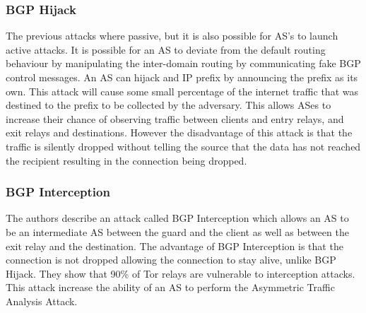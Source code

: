 \documentclass[9pt,technote]{IEEEtran}
\begin{document}
\subsubsection{BGP Hijack}
The previous attacks where passive, but it is also possible for AS's to launch
active attacks. It is possible for an AS to deviate from the default routing
behaviour by manipulating the inter-domain routing by communicating fake BGP
control messages. An AS can hijack and IP prefix by announcing the prefix as its
own. This attack will cause some small percentage of the internet traffic that
was destined to the prefix to be collected by the adversary. This allows ASes to
increase their chance of observing traffic between clients and entry relays, and
exit relays and destinations. However the disadvantage of this attack is that
the traffic is silently dropped without telling the source that the data has not
reached the recipient resulting in the connection being dropped.
\subsubsection{BGP Interception}
The authors describe an attack called BGP Interception which allows an AS to be
an intermediate AS between the guard and the client as well as between the exit
relay and the destination. The advantage of BGP Interception is that the
connection is not dropped allowing the connection to stay alive, unlike BGP
Hijack. They show that 90\% of Tor relays are vulnerable to interception
attacks. This attack increase the ability of an AS to perform the Asymmetric
Traffic Analysis Attack. 
\end{document}
